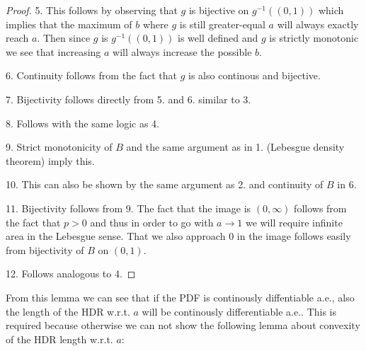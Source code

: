 \begin{proof}
    5. This follows by observing that $g$ is bijective on $g^{-1}((0,1))$ which implies that the maximum of $b$ where $g$ is still greater-equal $a$ will always exactly reach $a$. Then since $g$ is $g^{-1}((0,1))$ is well defined and $g$ is strictly monotonic we see that increasing $a$ will always increase the possible $b$.

    6. Continuity follows from the fact that $g$ is also continous and bijective.

    7. Bijectivity follows directly from 5. and 6. similar to 3.

    8. Follows with the same logic as 4.

    9. Strict monotonicity of $B$ and the same argument as in 1. (Lebesgue density theorem) imply this.

    10. This can also be shown by the same argument as 2. and continuity of $B$ in 6.

    11. Bijectivity follows from 9. The fact that the image is $(0,\infty)$ follows from the fact that $p>0$ and thus in order to go with $a \to 1$ we will require infinite area in the Lebesgue sense. That we also approach $0$ in the image follows easily from bijectivity of $B$ on $(0,1)$.

    12. Follows analogous to 4.
\end{proof}

From this lemma we can see that if the PDF is continously diffentiable a.e., also the length of the HDR w.r.t. $a$ will be continously differentiable a.e.. This is required because otherwise we can not show the following lemma about convexity of the HDR length w.r.t. $a$:


